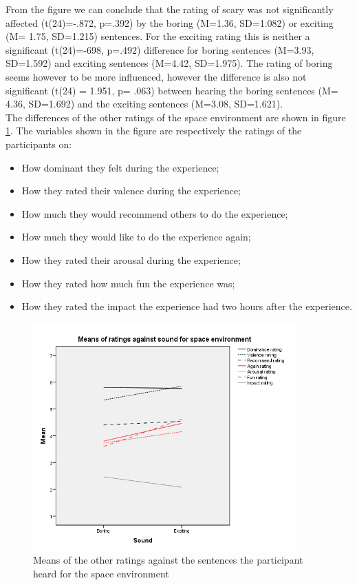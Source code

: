 \documentclass[Results.tex]{subfiles}
\begin{document}
From the figure we can conclude that the rating of scary was not significantly affected (t(24)=-.872, p=.392) by the boring (M=1.36, SD=1.082) or exciting (M= 1.75, SD=1.215) sentences. For the exciting rating this is neither a significant (t(24)=-698, p=.492) difference for boring sentences (M=3.93, SD=1.592) and exciting sentences (M=4.42, SD=1.975). The rating of boring seems however to be more influenced, however the difference is also not significant (t(24) = 1.951, p= .063) between hearing the boring sentences (M= 4.36, SD=1.692) and the exciting sentences (M=3.08, SD=1.621). \\

The differences of the other ratings of the space environment are shown in figure \ref{fig:Ratings2_sound_BM}. The variables shown in the figure are respectively the ratings of the participants on:
\begin{itemize}
\item How dominant they felt during the experience;
\item How they rated their valence during the experience;
\item How much they would recommend others to do the experience;
\item How much they would like to do the experience again;
\item How they rated their arousal during the experience;
\item How they rated how much fun the experience was;
\item How they rated the impact the experience had two hours after the experience.
\end{itemize}

\begin{figure}[H]
	\centering
		\includegraphics[width=0.90\textwidth]{Section_1/Figures/Ratings2_sound_BM.png}
	\caption{Means of the other ratings against the sentences the participant heard for the space environment}
	\label{fig:Ratings2_sound_BM}
\end{figure}
\end{document}
